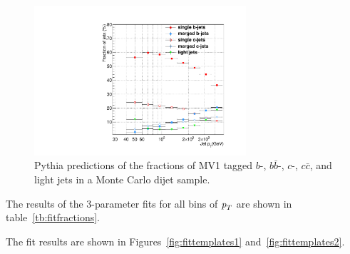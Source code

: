 \begin{figure}[tp]
\centering
\includegraphics[width=0.7\textwidth]{TrueFractions_NominalPythia.pdf}
\caption{Pythia predictions of the fractions of MV1 tagged $b$-, $b\bar{b}$-, $c$-, $c\bar{c}$, and light jets in a Monte Carlo dijet sample.}
\label{fig:truefractions}
\end{figure}




The results of the 3-parameter fits for all bins of ${\emph{p}_{T}}$ are shown in table~\ref{tb:fitfractions}.

The fit results are shown in Figures~\ref{fig:fittemplates1} and~\ref{fig:fittemplates2}.


